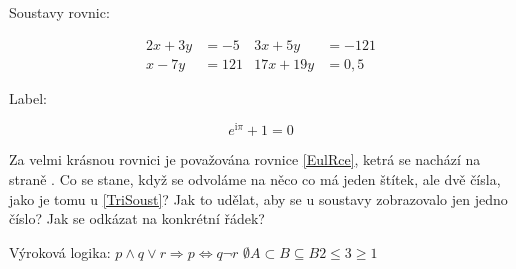 \documentclass[a4paper, 12pt]{article}
\begin{document}
Soustavy rovnic:

\begin{align} \label{TriSoust}
    2x + 3y & = -5  & 3x + 5y   & = -121  \\
    x - 7y  & = 121 & 17x + 19y & = 0{,}5
\end{align}

Label:

\begin{equation} \label{EulRce}
    e^{\mathrm{i} \pi} + 1 = 0
\end{equation}

Za velmi krásnou rovnici je považována rovnice \ref{EulRce}, ketrá se nachází na straně \pageref{EulRce}.
Co se stane, když se odvoláme na něco co má jeden štítek, ale dvě čísla, jako je tomu u \ref{TriSoust}?
Jak to udělat, aby se u soustavy zobrazovalo jen jedno číslo?
Jak se odkázat na konkrétní řádek?

Výroková logika:
$p \wedge q \vee r \Rightarrow p \Leftrightarrow q \neg r$
$ \emptyset A \subset B \subseteq B 2 \leq 3 \geq 1$
\end{document}
